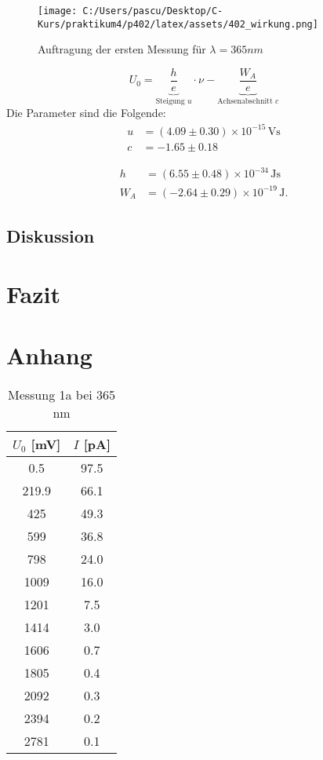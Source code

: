 \documentclass{article}
\begin{document}
\begin{figure}[h!]
  \centering
  \texttt{[image: C:/Users/pascu/Desktop/C-Kurs/praktikum4/p402/latex/assets/402\_wirkung.png]}
  \caption{Auftragung der ersten Messung für $ \lambda =365nm$}
  \label{fig:wirkungs}
\end{figure}

\begin{equation}
  U_0 = \underbrace{\frac{h}{e}}_{\text{Steigung } u} \cdot \nu - \underbrace{\frac{W_A}{e}}_{\text{Achsenabschnitt } c}
\end{equation}
Die Parameter sind die Folgende:
\begin{align}
  u &= (4.09 \pm 0.30) \times 10^{-15} \, \mathrm{Vs}\\
  c &= -1.65 \pm 0.18
\end{align}
  

\begin{align}
  h &= (6.55 \pm 0.48) \times 10^{-34} \, \mathrm{Js}\\
  W_A &=(-2.64 \pm 0.29) \times 10^{-19} \, \mathrm{J}.
\end{align}

\clearpage
\subsection{Diskussion}

\clearpage
\section{Fazit}


\clearpage
\section{Anhang}

\begin{table*}[h!]
  \centering
  \begin{tabular}{|c|c|}
      \hline
      $U_0$ [mV] & $I$ [pA] \\
      \hline
      0.5   & 97.5 \\
      219.9 & 66.1 \\
      425   & 49.3 \\
      599   & 36.8 \\
      798   & 24.0 \\
      1009  & 16.0 \\
      1201  & 7.5  \\
      1414  & 3.0  \\
      1606  & 0.7  \\
      1805  & 0.4  \\
      2092  & 0.3  \\
      2394  & 0.2  \\
      2781  & 0.1  \\
      \hline
  \end{tabular}
  \caption{Messung 1a bei 365 nm}
  \label{tab:messung1a}
\end{table*}
\end{document}
